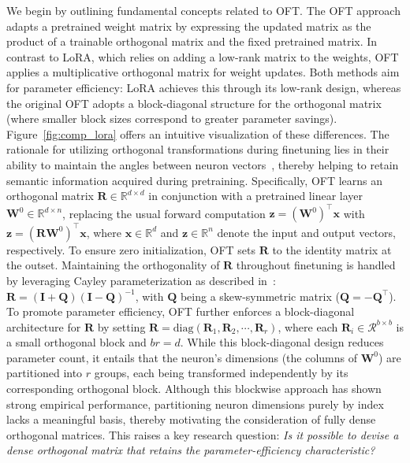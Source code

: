 We begin by outlining fundamental concepts related to OFT. The OFT approach adapts a pretrained weight matrix by expressing the updated matrix as the product of a trainable orthogonal matrix and the fixed pretrained matrix. In contrast to LoRA, which relies on adding a low-rank matrix to the weights, OFT applies a multiplicative orthogonal matrix for weight updates. Both methods aim for parameter efficiency: LoRA achieves this through its low-rank design, whereas the original OFT adopts a block-diagonal structure for the orthogonal matrix~\cite{qiu2023controlling} (where smaller block sizes correspond to greater parameter savings). Figure~\ref{fig:comp_lora} offers an intuitive visualization of these differences. The rationale for utilizing orthogonal transformations during finetuning lies in their ability to maintain the angles between neuron vectors~\cite{liu2018learning,liu2021orthogonal,qiu2023controlling}, thereby helping to retain semantic information acquired during pretraining. Specifically, OFT learns an orthogonal matrix $\bm{R}\in\mathbb{R}^{d\times d}$ in conjunction with a pretrained linear layer $\bm{W}^0\in\mathbb{R}^{d\times n}$, replacing the usual forward computation $\bm{z}=(\bm{W}^0)^\top\bm{x}$ with $\bm{z}=(\bm{R}\bm{W}^0)^\top\bm{x}$, where $\bm{x}\in\mathbb{R}^{d}$ and $\bm{z}\in\mathbb{R}^{n}$ denote the input and output vectors, respectively. To ensure zero initialization, OFT sets $\bm{R}$ to the identity matrix at the outset. Maintaining the orthogonality of $\bm{R}$ throughout finetuning is handled by leveraging Cayley parameterization as described in~\cite{qiu2023controlling,liu2021orthogonal}: $\bm{R}=(\bm{I}+\bm{Q})(\bm{I}-\bm{Q})^{-1}$, with $\bm{Q}$ being a skew-symmetric matrix ($\bm{Q}=-\bm{Q}^\top$). To promote parameter efficiency, OFT further enforces a block-diagonal architecture for $\bm{R}$ by setting $\bm{R}=\text{diag}(\bm{R}_1,\bm{R}_2,\cdots,\bm{R}_r)$, where each $\bm{R}_i\in\mathcal{R}^{b\times b}$ is a small orthogonal block and $br=d$. While this block-diagonal design reduces parameter count, it entails that the neuron's dimensions (the columns of $\bm{W}^0$) are partitioned into $r$ groups, each being transformed independently by its corresponding orthogonal block. Although this blockwise approach has shown strong empirical performance, partitioning neuron dimensions purely by index lacks a meaningful basis, thereby motivating the consideration of fully dense orthogonal matrices. This raises a key research question: \emph{Is it possible to devise a dense orthogonal matrix that retains the parameter-efficiency characteristic?}

